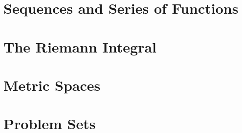 \chapter{Sequences and Series of Functions}





\chapter{The Riemann Integral}






\chapter{Metric Spaces}








\chapter{Problem Sets}






